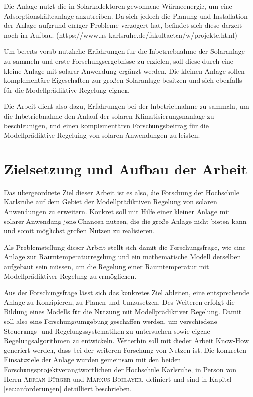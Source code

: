 Die Anlage nutzt die in Solarkollektoren gewonnene Wärmeenergie, um eine Adsorptionskälteanlage anzutreiben. Da sich jedoch die Planung und Installation der Anlage aufgrund einiger Probleme verzögert hat, befindet sich diese derzeit noch im Aufbau. 
(https://www.hs-karlsruhe.de/fakultaeten/w/projekte.html)

Um bereits vorab nützliche Erfahrungen für die Inbetriebnahme der Solaranlage zu sammeln und erste Forschungsergebnisse  zu erzielen, soll diese durch eine kleine Anlage mit solarer Anwendung ergänzt werden. Die kleinen Anlage sollen komplementäre Eigeschaften zur großen Solaranlage besitzen und sich ebenfalls für die Modellprädiktive Regelung eignen.

Die Arbeit dient also dazu, Erfahrungen bei der Inbetriebnahme zu sammeln, um die Inbetriebnahme den Anlauf der solaren Klimatisierungsnanlage zu beschleunigen, und einen komplementären Forschungsbeitrag für die Modellprädiktive Regeluing von solaren Anwendungen zu leisten. 

\section{Zielsetzung und Aufbau der Arbeit}
\label{sec:ziel}

Das übergeordnete Ziel dieser Arbeit ist es also, die Forschung der Hochschule Karlsruhe auf dem Gebiet der Modellprädiktiven Regelung von solaren Anwendungen zu erweitern.
Konkret soll mit Hilfe einer kleiner Anlage mit solarer Anwendung jene Chancen nutzen, die die große Anlage nicht bieten kann und somit möglichst großen Nutzen zu realisieren. 

Als Problemstellung dieser Arbeit stellt sich damit die Forschungsfrage, wie eine Anlage zur Raumtemperaturregelung und ein mathematische Modell derselben aufgebaut sein müssen, um die Regelung einer Raumtemperatur mit Modellprädiktiver Regelung zu ermöglichen.


Aus der Forschungsfrage lässt sich das konkretes Ziel ableiten, eine entsprechende Anlage zu Konzipieren, zu Planen und Umzusetzen. Des Weiteren erfolgt die Bildung eines Modells für die Nutzung mit Modellprädiktiver Regelung.
Damit soll also eine Forschungsumgebung geschaffen werden, um verschiedene Steuerungs- und Regelungssystematiken zu untersuchen sowie eigene Regelungsalgorithmen zu entwickeln. Weiterhin soll mit dieder Arbeit Know-How generiert werden, dass bei der weiteren Forschung von Nutzen ist. Die konkreten Einsatzziele der Anlage wurden gemeinsam mit den beiden Forschungsprojektverangtwortlichen der Hochschule Karlsruhe, in Person von Herrn \textsc{Adrian Bürger} und \textsc{Markus Bohlayer}, definiert und sind in Kapitel \ref{sec:anforderungen} detailliert beschrieben.


